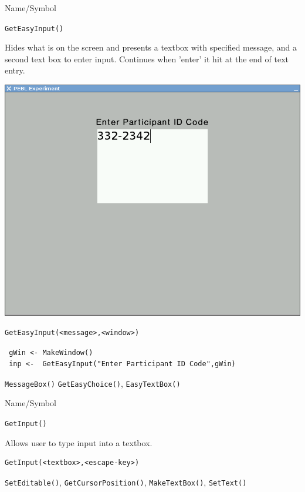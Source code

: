   
\begin{desc}{Name/Symbol}
\item[Name/Symbol]	\verb+GetEasyInput()+

\item[Description]	Hides what is on the screen and presents a textbox with
  specified message, and a second text box to enter input.  Continues
  when 'enter' it hit at the end of text entry.

\item[Usage]		
\includegraphics[scale=.25]{images/EasyInput.png}

\begin{verbatim}
GetEasyInput(<message>,<window>)
\end{verbatim}

\item[Example]	


\begin{verbatim}
 gWin <- MakeWindow()
 inp <-  GetEasyInput("Enter Participant ID Code",gWin)
\end{verbatim}

\item[See Also]\verb+MessageBox()+	\verb+GetEasyChoice()+, \verb+EasyTextBox()+
\end{desc}

\begin{desc}{Name/Symbol}
\item[Name/Symbol]	\verb+GetInput()+

\item[Description]	Allows user to type input into a textbox.

\item[Usage]
\begin{verbatim}
GetInput(<textbox>,<escape-key>)
\end{verbatim}

\item[Example]	

\item[See Also]	\verb+SetEditable()+, \verb+GetCursorPosition()+, \verb+MakeTextBox()+, \verb+SetText()+
\end{desc}



